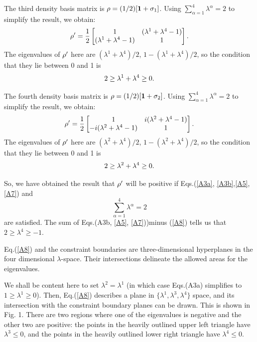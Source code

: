\documentclass[aps,pra,twocolumn,amssymb, amsfonts,amsmath,showpacs, superscriptaddress]{revtex4}
\begin{document}
\begin{appendix}
The third density basis matrix is ${\bf\rho}=(1/2)[{\bf 1}+{\bf \sigma}_{1}]$.  Using $\sum_{\alpha=1}^{4}\lambda^{\alpha}=2$ to simplify the result, we obtain:
\begin{equation}\label{A4}
{\bf \rho}'
=\frac{1}{2}\begin{bmatrix}1&(\lambda^{1}+\lambda^{4}-1)\\
(\lambda^{1}+\lambda^{4}-1)&1
\end{bmatrix}.
\end{equation}
The eigenvalues of ${\bf \rho}'$  here are $(\lambda^{1}+\lambda^{4})/2$, $1-(\lambda^{1}+\lambda^{4})/2$, so the condition that they lie between 0 and 1 is
 \begin{equation}\label{A5}
2\geq\lambda^{1}+\lambda^{4}\geq 0\\.
\end{equation}

The fourth density basis matrix is ${\bf\rho}=(1/2)[{\bf 1}+{\bf \sigma}_{2}]$.  Using $\sum_{\alpha=1}^{4}\lambda^{\alpha}=2$ to simplify the result, we obtain:
\begin{equation}\label{A6}
{\bf \rho}'
=\frac{1}{2}\begin{bmatrix}1&i(\lambda^{2}+\lambda^{4}-1)\\
-i(\lambda^{2}+\lambda^{4}-1)&1
\end{bmatrix}.
\end{equation}
The eigenvalues of ${\bf \rho}'$  here are $(\lambda^{2}+\lambda^{4})/2$, $1-(\lambda^{2}+\lambda^{4})/2$, so the condition that they lie between 0 and 1 is
 \begin{equation}\label{A7}
2\geq\lambda^{2}+\lambda^{4}\geq 0\\.
\end{equation}
 

So, we have obtained the result that ${\bf \rho}'$ will  be positive if Eqs.(\ref{A3a}, \ref{A3b},\ref{A5},\ref{A7}) and 
\begin{equation}\label{A8}
\sum_{\alpha=1}^{4}\lambda^{\alpha}=2
\end{equation}
\noindent  are satisfied.  The sum of  Eqs.(A3b, \ref{A5}, \ref{A7}))minus (\ref{A8}) tells us that $2\geq \lambda^{4}\geq -1$. 

 Eq.(\ref{A8}) and the constraint boundaries  are  three-dimensional hyperplanes in the four dimensional $\lambda$-space.
  Their intersections delineate the allowed areas for the eigenvalues.  
 
 We shall be content here to set $\lambda^{2}=\lambda^{1}$ (in which case 
 Eqs.(A3a) simplifies to $1\geq \lambda^{1}\geq 0$). Then, 
 Eq.(\ref{A8}) describes a plane in $\{\lambda^{1},\lambda^{3}, \lambda^{4}\}$ space, and its intersection with the 
 constraint boundary planes can be drawn.  This is shown in Fig. 1. There are two regions where one of the eigenvalues is negative and the other two are positive:  the points in the heavily outlined upper left triangle have $\lambda^{3}\leq 0$, and 
 the points in the heavily outlined lower right triangle have $\lambda^{4}\leq 0$.
 

\end{appendix}
\end{document}
